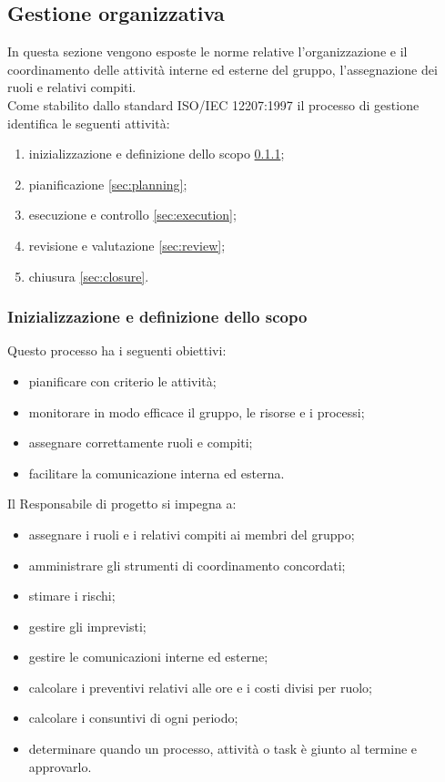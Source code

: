 \subsection{Gestione organizzativa}\label{sec:management_process}
    In questa sezione vengono esposte le norme relative l'organizzazione e il coordinamento delle attività interne ed esterne del gruppo, l'assegnazione dei ruoli e relativi compiti. \\
    Come stabilito dallo standard ISO/IEC 12207:1997 \cite{bib:ISO12207_1997} il processo di gestione identifica le seguenti attività:
    \begin{enumerate}
        \item inizializzazione e definizione dello scopo \ref{sec:scope};
        \item pianificazione \ref{sec:planning};
        \item esecuzione e controllo \ref{sec:execution};
        \item revisione e valutazione \ref{sec:review};
        \item chiusura \ref{sec:closure}.
    \end{enumerate}

    \subsubsection{Inizializzazione e definizione dello scopo}\label{sec:scope}

        Questo processo ha i seguenti obiettivi:
        \begin{itemize}
            \item pianificare con criterio le attività;
            \item monitorare in modo efficace il gruppo, le risorse e i processi;
            \item assegnare correttamente ruoli e compiti;
            \item facilitare la comunicazione interna ed esterna.
        \end{itemize}

        \vspace{0.3cm}
        \noindent
        Il Responsabile di progetto si impegna a:
        \begin{itemize}
            \item assegnare i ruoli e i relativi compiti ai membri del gruppo;
            \item amministrare gli strumenti di coordinamento concordati;
            \item stimare i rischi;
            \item gestire gli imprevisti;
            \item gestire le comunicazioni interne ed esterne;
            \item calcolare i preventivi relativi alle ore e i costi divisi per ruolo;
            \item calcolare i consuntivi di ogni periodo;
            \item determinare quando un processo, attività o task è giunto al termine e approvarlo. 
        \end{itemize}


